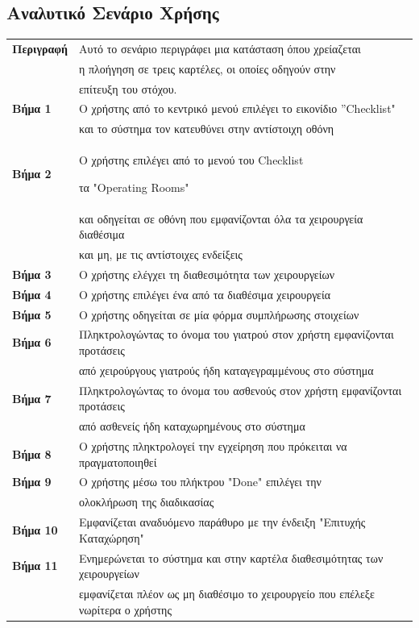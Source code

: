 \documentclass{article}
\newcommand\T{\rule{0pt}{2.6ex}}       %
\newcommand\B{\rule[-1.2ex]{0pt}{0pt}}
\begin{document}
 \subsection{Αναλυτικό Σενάριο Χρήσης}
 
 \begin{center}
     \begin{tabular}{|l|l|}
     \hline
      \textbf{Περιγραφή} & Αυτό το σενάριο περιγράφει μια κατάσταση όπου χρείαζεται \T \\& η πλοήγηση σε τρεις καρτέλες, οι οποίες οδηγούν στην \\& επίτευξη του στόχου. \B \\ 
      \hline
      \textbf{Βήμα 1} & Ο χρήστης από το κεντρικό μενού επιλέγει το εικονίδιο  ”Checklist" \T \\& και το σύστημα τον κατευθύνει στην αντίστοιχη οθόνη \B \\
      \hline
      \textbf{Βήμα 2} & Ο χρήστης επιλέγει από το μενού του Checklist \T  τα "Operating Rooms" \T \\& και οδηγείται σε οθόνη που εμφανίζονται όλα τα χειρουργεία διαθέσιμα\\& και μη, με τις αντίστοιχες ενδείξεις \B \\
      \hline
      \textbf{Βήμα 3} & Ο χρήστης ελέγχει τη διαθεσιμότητα των χειρουργείων \T\B \\
      \hline
      \textbf{Βήμα 4} & Ο χρήστης επιλέγει ένα από τα διαθέσιμα χειρουργεία \T\B \\
      \hline
      \textbf{Βήμα 5} & Ο χρήστης οδηγείται σε μία φόρμα συμπλήρωσης στοιχείων \T\B \\
      \hline
      \textbf{Βήμα 6} & Πληκτρολογώντας το όνομα του γιατρού στον χρήστη εμφανίζονται προτάσεις \T \\& από χειρούργους γιατρούς ήδη καταγεγραμμένους στο σύστημα \B \\
      \hline
      \textbf{Βήμα 7} & Πληκτρολογώντας το όνομα του ασθενούς στον χρήστη εμφανίζονται προτάσεις \T \\& από ασθενείς ήδη καταχωρημένους στο σύστημα \B \\
      \hline      
      \textbf{Βήμα 8} & Ο χρήστης πληκτρολογεί την εγχείρηση που πρόκειται να πραγματοποιηθεί \T\B \\   
      \hline
      \textbf{Βήμα 9} & Ο χρήστης μέσω του πλήκτρου "Done" επιλέγει την \T \\& ολοκλήρωση της διαδικασίας \B \\
      \hline
      \textbf{Βήμα 10} & Εμφανίζεται αναδυόμενο παράθυρο με την ένδειξη "Επιτυχής Καταχώρηση" \T\B \\
      \hline
      \textbf{Βήμα 11} & Ενημερώνεται το σύστημα και στην καρτέλα διαθεσιμότητας των χειρουργείων \T \\& εμφανίζεται πλέον ως μη διαθέσιμο το χειρουργείο που επέλεξε νωρίτερα ο χρήστης \B \\
      \hline
     \end{tabular}
 \end{center}
 
\end{document}
